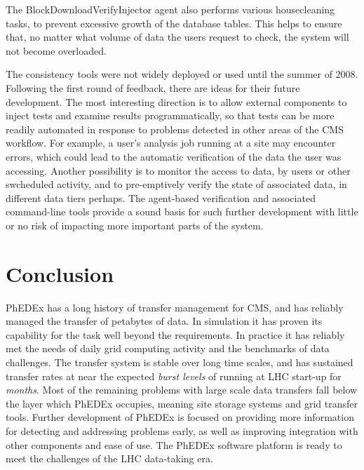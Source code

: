 \documentclass{PoS}
\begin{document}
The BlockDownloadVerifyInjector agent also performs various
housecleaning tasks, to prevent excessive growth of the database
tables. This helps to ensure that, no matter what volume of data the
users request to check, the system will not become overloaded.

The consistency tools were not widely deployed or used until the
summer of 2008. Following the first round of feedback, there are ideas
for their future development. The most interesting direction is to
allow external components to inject tests and examine results
programmatically, so that tests can be more readily automated in
response to problems detected in other areas of the CMS workflow. For
example, a user's analysis job running at a site may encounter errors,
which could lead to the automatic verification of the data the user
was accessing. Another possibility is to monitor the access to data,
by users or other swcheduled activity, and to pre-emptively verify the
state of associated data, in different data tiers perhaps. The
agent-based verification and associated command-line tools provide a
sound basis for such further development with little or no risk of
impacting more important parts of the system.

\section{Conclusion}

PhEDEx has a long history of transfer management for CMS, and has
reliably managed the transfer of petabytes of data.  In simulation it
has proven its capability for the task well beyond the requirements.
In practice it has reliably met the needs of daily grid computing
activity and the benchmarks of data challenges.  The transfer system
is stable over long time scales, and has sustained transfer rates at
near the expected \emph{burst levels} of running at LHC start-up for
\emph{months}.  Most of the remaining problems with large scale data
transfers fall below the layer which PhEDEx occupies, meaning site
storage systems and grid transfer tools.  Further development of
PhEDEx is focused on providing more information for detecting and
addressing problems early, as well as improving integration with other
components and ease of use.  The PhEDEx software platform is ready to
meet the challenges of the LHC data-taking era.



\end{document}
